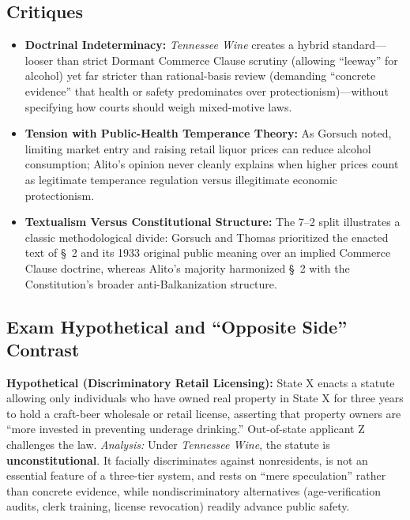 \documentclass[12pt]{article}
\begin{document}
\subsection{Critiques}
\begin{itemize}
    \item \textbf{Doctrinal Indeterminacy:} \textit{Tennessee Wine} creates a hybrid standard---looser than strict Dormant Commerce Clause scrutiny (allowing ``leeway'' for alcohol) yet far stricter than rational-basis review (demanding ``concrete evidence'' that health or safety predominates over protectionism)---without specifying how courts should weigh mixed-motive laws.
    \item \textbf{Tension with Public-Health Temperance Theory:} As Gorsuch noted, limiting market entry and raising retail liquor prices can reduce alcohol consumption; Alito's opinion never cleanly explains when higher prices count as legitimate temperance regulation versus illegitimate economic protectionism.
    \item \textbf{Textualism Versus Constitutional Structure:} The 7--2 split illustrates a classic methodological divide: Gorsuch and Thomas prioritized the enacted text of \S~2 and its 1933 original public meaning over an implied Commerce Clause doctrine, whereas Alito's majority harmonized \S~2 with the Constitution's broader anti-Balkanization structure.
\end{itemize}

\subsection{Exam Hypothetical and ``Opposite Side'' Contrast}
\textbf{Hypothetical (Discriminatory Retail Licensing):} State X enacts a statute allowing only individuals who have owned real property in State X for three years to hold a craft-beer wholesale or retail license, asserting that property owners are ``more invested in preventing underage drinking.'' Out-of-state applicant Z challenges the law. \textit{Analysis:} Under \textit{Tennessee Wine}, the statute is \textbf{unconstitutional}. It facially discriminates against nonresidents, is not an essential feature of a three-tier system, and rests on ``mere speculation'' rather than concrete evidence, while nondiscriminatory alternatives (age-verification audits, clerk training, license revocation) readily advance public safety.
\end{document}
